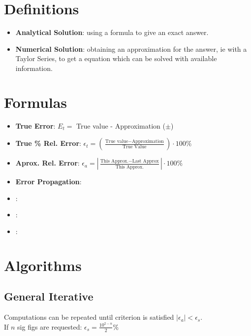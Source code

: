 \documentclass[fontsize=4pt]{scrartcl}
\begin{document}
\begin{multicols}{4}
  \section{Definitions}
    \begin{itemize}
      \item \textbf{Analytical Solution}: using a formula to give an exact answer.
      \item \textbf{Numerical Solution}: obtaining an approximation for the answer, 
            ie with a Taylor Series, to get a equation which can be solved with available
            information.
    \end{itemize}

  \section{Formulas}
      \begin{itemize}
        \item \textbf{True Error}: $E_t =$ True value - Approximation ($\pm$)
        \item \textbf{True \% Rel. Error}: $\epsilon_t = (\frac{\text{True value} - \text{Approximation}}{\text{True Value}})\cdot100\%$
        \item \textbf{Aprox. Rel. Error}: $\epsilon_a =  |\frac{\text{This Approx.} - \text{Last Approx}}{\text{This Approx.}}|\cdot100\%$
        \item \textbf{Error Propagation}: 
        \item \textbf{}: 
        \item \textbf{}: 
        \item \textbf{}: 
      \end{itemize}
      
  \section{Algorithms}
    \subsection{General Iterative}
      Computations can be repeated until criterion is satisfied $|\epsilon_a| < \epsilon_s$. \\
      If $n$ sig figs are requested: $\epsilon_s = \frac{10^{2-n}}{2}\%$ \\

\end{multicols}
\end{document}
